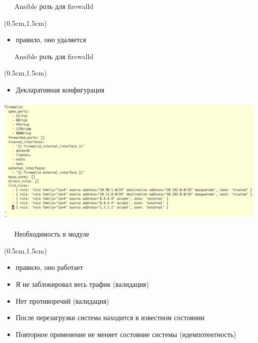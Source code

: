 \documentclass[xetex,18pt,aspectratio=43]{beamer}
\begin{document}
\begin{Large}
\begin{frame}{\ \ \ Ansible роль для firewalld}
\begin{textblock*}{\framewidth-0.8cm}(0.5cm,1.5cm)
\begin{itemize}
  \item {\color {red}{\bf Я удаляю} правило, оно удаляется}
\end{itemize}
\end{textblock*}
\end{frame}

\begin{frame}{\ \ \ Ansible роль для firewalld}
\begin{textblock*}{\framewidth-0.8cm}(0.5cm,1.5cm)
\begin{itemize}
  \item Декларативная конфигурация
\end{itemize}
\begin{minipage}{\textwidth}
  \centering
  \includegraphics[height=6.3cm]{img/fwroleconfig}
\end{minipage}
\end{textblock*}
\end{frame}

\begin{frame}{\ \ \ Необходимость в модуле}
\begin{textblock*}{\framewidth-0.8cm}(0.5cm,1.5cm)
\begin{itemize}
  \item {\color {darkpastelgreen}{\bf Я добавляю} правило, оно работает}
  \item {\color {darkpastelgreen}Я не заблокировал весь трафик (валидация)}
  \item {\color {darkpastelgreen}Нет противоречий (валидация)}
  \item {\color {darkpastelgreen}После перезагрузки система находится в известном состоянии}
  \item {\color {darkpastelgreen}Повторное применение не меняет состояние системы (идемпотентность)}
\end{itemize}
\end{textblock*}
\end{frame}


\end{Large}
\end{document}

